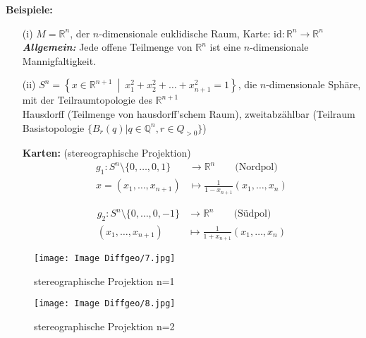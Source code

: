 \documentclass[fleqn, 12pt, letterpaper]{article}
\newcommand{\txt}[1]{\text{#1}}
\begin{document}
\textbf{Beispiele:}
\begin{itemize}
    \item[(i)] $M = \mathbb{R}^n$, der $n$-dimensionale euklidische Raum, Karte: $\text{id} : \mathbb{R}^n \to \mathbb{R}^n$ \\
    \textbf{\textit{Allgemein:}} Jede offene Teilmenge von $\mathbb{R}^n$ ist eine $n$-dimensionale Mannigfaltigkeit.

    \item[(ii)] $S^n = \left\{ x \in \mathbb{R}^{n+1} \ \middle| \ x_1^2 + x_2^2 + \ldots + x_{n+1}^2 = 1 \right\}$, die $n$-dimensionale Sphäre, mit der Teilraumtopologie des $\mathbb{R}^{n+1}$ \\
    Hausdorff (Teilmenge von hausdorff'schem Raum), zweitabzählbar (Teilraum Basistopologie $\{B_r(q)|q\in \mathbb{Q}^n, r\in Q_{>0}\}$)

    \textbf{Karten:} (stereographische Projektion)
    \begin{align*}
        g_1 : S^n \setminus \{0, \ldots, 0, 1\} &\to \mathbb{R}^n \qquad \txt{(Nordpol)} \\
        x = (x_1, \ldots, x_{n+1}) &\mapsto \frac{1}{1 - x_{n+1}} (x_1, \ldots, x_n)
    \end{align*}

    \begin{align*}
        g_2 : S^n \setminus \{0, \ldots, 0, -1\} &\to \mathbb{R}^n \qquad \txt{(Südpol)}\\
        (x_1, \ldots, x_{n+1}) &\mapsto \frac{1}{1 + x_{n+1}} (x_1, \ldots, x_n)
    \end{align*}
\end{itemize}
\begin{figure}[H]
    \centering
    \texttt{[image: Image Diffgeo/7.jpg]}
	\caption{stereographische Projektion n=1}
 \end{figure}
 \begin{figure}[H]
    \centering
    \texttt{[image: Image Diffgeo/8.jpg]}
	\caption{stereographische Projektion n=2}
 \end{figure}
\end{document}
